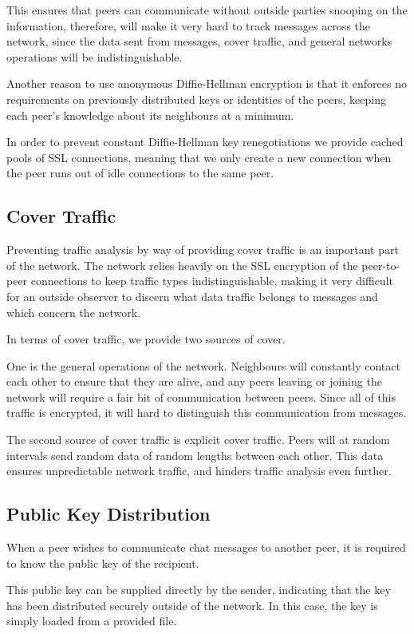 This ensures that peers can communicate without outside parties snooping on the information, therefore, will make it very hard to track messages across the network, since the data sent from messages, cover traffic, and general networks operations will be indistinguishable.

Another reason to use anonymous Diffie-Hellman encryption is that it enforces no requirements on previously distributed keys or identities of the peers, keeping each peer's knowledge about its neighbours at a minimum.

In order to prevent constant Diffie-Hellman key renegotiations we provide cached pools of SSL connections, meaning that we only create a new connection when the peer runs out of idle connections to the same peer.

\subsection{Cover Traffic}

Preventing traffic analysis by way of providing cover traffic is an important part of the network. The network relies heavily on the SSL encryption of the peer-to-peer connections to keep traffic types indistinguishable, making it very difficult for an outside observer to discern what data traffic belongs to messages and which concern the network.

In terms of cover traffic, we provide two sources of cover.

One is the general operations of the network. Neighbours will constantly contact each other to ensure that they are alive, and any peers leaving or joining the network will require a fair bit of communication between peers. Since all of this traffic is encrypted, it will hard to distinguish this communication from messages.

The second source of cover traffic is explicit cover traffic. Peers will at random intervals send random data of random lengths between each other. This data ensures unpredictable network traffic, and hinders traffic analysis even further.

\subsection{Public Key Distribution}

When a peer wishes to communicate chat messages to another peer, it is required to know the public key of the recipient.

This public key can be supplied directly by the sender, indicating that the key has been distributed securely outside of the network. In this case, the key is simply loaded from a provided file.

